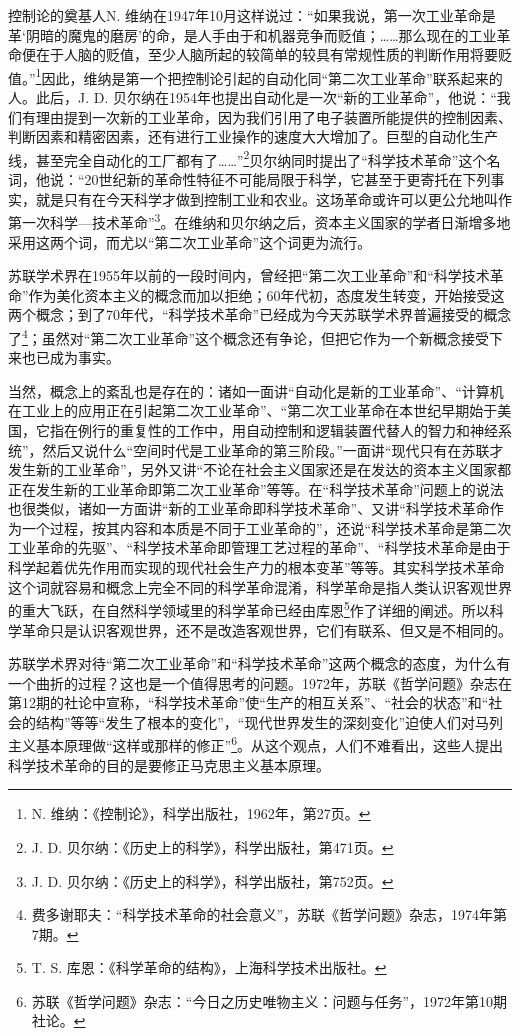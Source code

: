 控制论的奠基人N. 维纳在1947年10月这样说过：“如果我说，第一次工业革命是革‘阴暗的魔鬼的磨房’的命，是人手由于和机器竞争而贬值；……那么现在的工业革命便在于人脑的贬值，至少人脑所起的较简单的较具有常规性质的判断作用将要贬值。”\footnote{N. 维纳：《控制论》，科学出版社，1962年，第27页。}因此，维纳是第一个把控制论引起的自动化同“第二次工业革命”联系起来的人。此后，J. D. 贝尔纳在1954年也提出自动化是一次“新的工业革命”，他说：“我们有理由提到一次新的工业革命，因为我们引用了电子装置所能提供的控制因素、判断因素和精密因素，还有进行工业操作的速度大大增加了。巨型的自动化生产线，甚至完全自动化的工厂都有了……”\footnote{J. D. 贝尔纳：《历史上的科学》，科学出版社，第471页。}贝尔纳同时提出了“科学技术革命”这个名词，他说：“20世纪新的革命性特征不可能局限于科学，它甚至于更寄托在下列事实，就是只有在今天科学才做到控制工业和农业。这场革命或许可以更公允地叫作第一次科学—技术革命”\footnote{J. D. 贝尔纳：《历史上的科学》，科学出版社，第752页。}。在维纳和贝尔纳之后，资本主义国家的学者日渐增多地采用这两个词，而尤以“第二次工业革命”这个词更为流行。

苏联学术界在1955年以前的一段时间内，曾经把“第二次工业革命”和“科学技术革命”作为美化资本主义的概念而加以拒绝；60年代初，态度发生转变，开始接受这两个概念；到了70年代，“科学技术革命”已经成为今天苏联学术界普遍接受的概念了\footnote{费多谢耶夫：“科学技术革命的社会意义”，苏联《哲学问题》杂志，1974年第7期。}；虽然对“第二次工业革命”这个概念还有争论，但把它作为一个新概念接受下来也已成为事实。

当然，概念上的紊乱也是存在的：诸如一面讲“自动化是新的工业革命”、“计算机在工业上的应用正在引起第二次工业革命”、“第二次工业革命在本世纪早期始于美国，它指在例行的重复性的工作中，用自动控制和逻辑装置代替人的智力和神经系统”，然后又说什么“空间时代是工业革命的第三阶段。”一面讲“现代只有在苏联才发生新的工业革命”，另外又讲“不论在社会主义国家还是在发达的资本主义国家都正在发生新的工业革命即第二次工业革命”等等。在“科学技术革命”问题上的说法也很类似，诸如一方面讲“新的工业革命即科学技术革命”、又讲“科学技术革命作为一个过程，按其内容和本质是不同于工业革命的”，还说“科学技术革命是第二次工业革命的先驱”、“科学技术革命即管理工艺过程的革命”、“科学技术革命是由于科学起着优先作用而实现的现代社会生产力的根本变革”等等。其实科学技术革命这个词就容易和概念上完全不同的科学革命混淆，科学革命是指人类认识客观世界的重大飞跃，在自然科学领域里的科学革命已经由库恩\footnote{T. S. 库恩：《科学革命的结构》，上海科学技术出版社。}作了详细的阐述。所以科学革命只是认识客观世界，还不是改造客观世界，它们有联系、但又是不相同的。

苏联学术界对待“第二次工业革命”和“科学技术革命”这两个概念的态度，为什么有一个曲折的过程？这也是一个值得思考的问题。1972年，苏联《哲学问题》杂志在第12期的社论中宣称，“科学技术革命”使“生产的相互关系”、“社会的状态”和“社会的结构”等等“发生了根本的变化”，“现代世界发生的深刻变化”迫使人们对马列主义基本原理做“这样或那样的修正”\footnote{苏联《哲学问题》杂志：“今日之历史唯物主义：问题与任务”，1972年第10期社论。}。从这个观点，人们不难看出，这些人提出科学技术革命的目的是要修正马克思主义基本原理。


